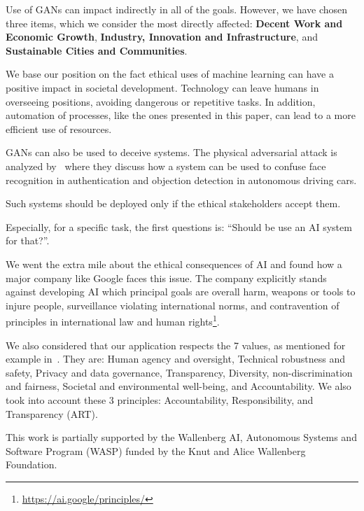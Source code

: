 \documentclass[12pt]{article}
\begin{document}
    Use of GANs can impact indirectly in all of the goals.
    However, we have chosen three items, which we consider the most directly affected:
    \textbf{Decent Work and Economic Growth}, \textbf{Industry, Innovation and Infrastructure}, and
    \textbf{Sustainable Cities and Communities}.

    We base our position on the fact ethical uses of machine learning can have a positive impact in societal development.
    Technology can leave humans in overseeing positions, avoiding dangerous or repetitive tasks.
    In addition, automation of processes, like the ones presented in this paper, can lead to a more efficient use of resources.

    GANs can also be used to deceive systems.
    The physical adversarial attack is analyzed by~\cite{arxiv:1812.10217} where they discuss
    how a system can be used to confuse face recognition in authentication and objection detection in autonomous driving cars.

    Such systems should be deployed only if the ethical stakeholders accept them.

    Especially, for a specific task, the first questions is: ``Should be use an AI system for that?''.

    We went the extra mile about the ethical consequences of AI and found how a major company like Google faces this issue.
    The company explicitly stands against developing AI which principal goals are overall harm, weapons or tools to injure people, surveillance violating international norms, and contravention of principles in international law and human rights\footnote{\url{https://ai.google/principles/}}.

    We also considered that our application respects the 7 values, as mentioned for example in~\cite{easa:20210401.01}.
    They are: Human agency and oversight, Technical robustness and safety, Privacy and data governance, Transparency, Diversity, non-discrimination and fairness, Societal and environmental well-being, and Accountability.
    We also took into account these 3 principles: Accountability, Responsibility, and Transparency (ART)\cite{doi:10.1145/3278721.3278745}.

    \begin{ack}
        This work is partially supported by the Wallenberg AI, Autonomous Systems and Software Program (WASP) funded by the Knut and Alice Wallenberg Foundation.
    \end{ack}

    

    
\end{document}
